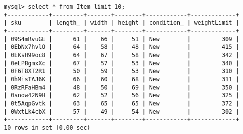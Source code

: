 \documentclass[american,extrafontsizes,12pt,portrait,letterpaper,oneside,onecolumn,article,final]{memoir}
\begin{document}
\begin{verbatim}
mysql> select * from Item limit 10;
+------------+---------+-------+--------+------------+-------------+
| sku        | length_ | width | height | condition_ | weightLimit |
+------------+---------+-------+--------+------------+-------------+
| 09S4mRvuGE |      61 |    66 |     51 | New        |         309 |
| 0EbNx7hvlO |      64 |    58 |     48 | New        |         415 |
| 0EKsH99oc8 |      64 |    67 |     58 | New        |         342 |
| 0eLPBgmxXc |      67 |    57 |     53 | New        |         340 |
| 0F6T8XT2R1 |      50 |    59 |     53 | New        |         310 |
| 0hMisTAJ6K |      66 |    60 |     68 | New        |         311 |
| 0RzRFaHBm4 |      48 |    50 |     69 | New        |         350 |
| 0snow42N9H |      62 |    52 |     56 | New        |         325 |
| 0t5AqpGvtk |      63 |    65 |     65 | New        |         372 |
| 0WxtLk4cbX |      57 |    49 |     54 | New        |         302 |
+------------+---------+-------+--------+------------+-------------+
10 rows in set (0.00 sec)


\end{verbatim}
\end{document}
